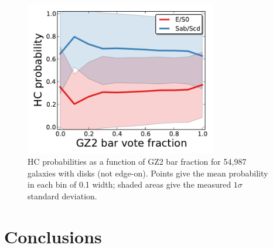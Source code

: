 \documentclass[useAMS,usenatbib]{mn2e}
\begin{document}
\begin{figure}
\includegraphics[angle=0,width=3.3in]{figures/hc_gz2_bar.pdf}
\caption{HC probabilities as a function of GZ2 bar fraction for 54,987 galaxies with disks (not edge-on). Points give the mean probability in each bin of 0.1 width; shaded areas give the measured $1\sigma$ standard deviation. 
\label{fig-hc_gz2_bar}}
\end{figure}

%


%


\section{Conclusions}\label{sec-conclusion}
\end{document}
